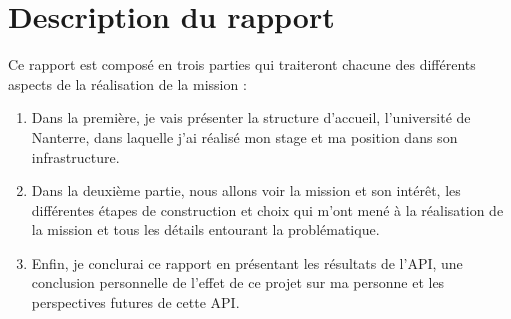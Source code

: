\titleformat{\chapter}[display]
  {\normalfont\bfseries}{}{0pt}{\Large}

\chapter{Description du rapport}

Ce rapport est composé en trois parties qui traiteront chacune des différents aspects de la réalisation de la mission :\\

\begin{enumerate}
\item Dans la première, je vais présenter la structure d'accueil, l'université de Nanterre, dans laquelle j'ai réalisé mon stage et ma position dans son infrastructure.\\
\item Dans la deuxième partie, nous allons voir la mission et son intérêt, les différentes étapes de construction et choix qui m'ont mené à la réalisation de la mission et tous les détails entourant la problématique.\\
\item Enfin, je conclurai ce rapport en présentant les résultats de l'API, une conclusion personnelle de l'effet de ce projet sur ma personne et les perspectives futures de cette API.\\
\end{enumerate}